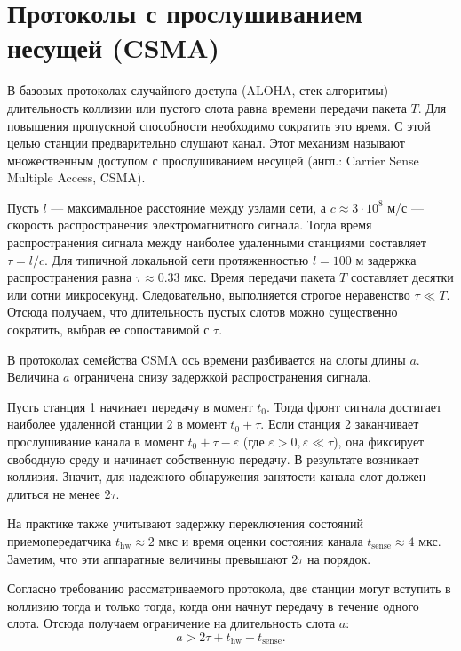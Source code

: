 \section{Протоколы с прослушиванием несущей (CSMA)}

В базовых протоколах случайного доступа (ALOHA, стек-алгоритмы) длительность коллизии или пустого слота равна времени передачи пакета $T$. Для повышения пропускной способности необходимо сократить это время. С этой целью станции предварительно слушают канал. Этот механизм называют множественным доступом с прослушиванием несущей (англ.: Carrier Sense Multiple Access, CSMA).

Пусть $l$ — максимальное расстояние между узлами сети, а $c \approx 3 \cdot 10^8$ м/с — скорость распространения электромагнитного сигнала. Тогда время распространения сигнала между наиболее удаленными станциями составляет $\tau = l/c$. Для типичной локальной сети протяженностью $l = 100$ м задержка распространения равна $\tau \approx 0.33$ мкс. Время передачи пакета $T$ составляет десятки или сотни микросекунд. Следовательно, выполняется строгое неравенство $\tau \ll T$. Отсюда получаем, что длительность пустых слотов можно существенно сократить, выбрав ее сопоставимой с $\tau$.

\begin{note}
    В протоколах семейства CSMA ось времени разбивается на слоты длины $a$. Величина $a$ ограничена снизу задержкой распространения сигнала.
    
    Пусть станция 1 начинает передачу в момент $t_0$. Тогда фронт сигнала достигает наиболее удаленной станции 2 в момент $t_0 + \tau$. Если станция 2 заканчивает прослушивание канала в момент $t_0 + \tau - \varepsilon$ (где $\varepsilon > 0, \varepsilon \ll \tau$), она фиксирует свободную среду и начинает собственную передачу. В результате возникает коллизия. Значит, для надежного обнаружения занятости канала слот должен длиться не менее $2 \tau$. 
    
    На практике также учитывают задержку переключения состояний приемопередатчика $t_{\text{hw}} \approx 2$ мкс и время оценки состояния канала $t_{\text{sense}} \approx 4$ мкс. Заметим, что эти аппаратные величины превышают $2 \tau$ на порядок.
\end{note}

Согласно требованию рассматриваемого протокола, две станции могут вступить в коллизию тогда и только тогда, когда они начнут передачу в течение одного слота. Отсюда получаем ограничение на длительность слота $a$:
\[
    a > 2\tau + t_{\text{hw}} + t_{\text{sense}}.
\]

